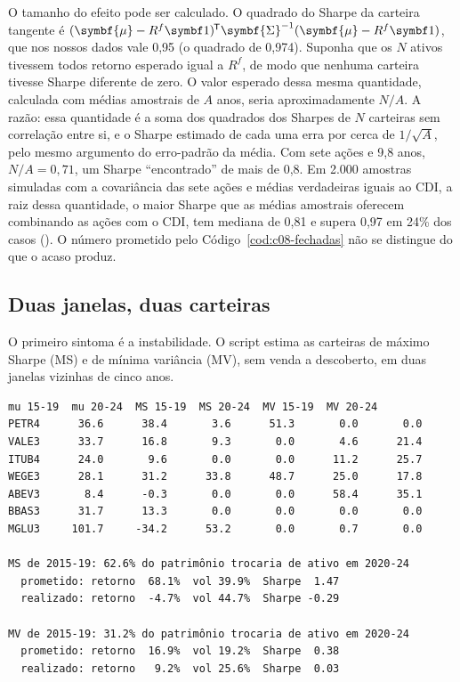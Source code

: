 O tamanho do efeito pode ser calculado. O quadrado do Sharpe da carteira tangente é $(\symbf{\mu} - R^f\vetor{1})\T\symbf{\Sigma}^{-1}(\symbf{\mu} - R^f\vetor{1})$, que nos nossos dados vale 0,95 (o quadrado de 0,974). Suponha que os $N$ ativos tivessem todos retorno esperado igual a $R^f$, de modo que nenhuma carteira tivesse Sharpe diferente de zero. O valor esperado dessa mesma quantidade, calculada com médias amostrais de $A$ anos, seria aproximadamente $N/A$. A razão: essa quantidade é a soma dos quadrados dos Sharpes de $N$ carteiras sem correlação entre si, e o Sharpe estimado de cada uma erra por cerca de $1/\sqrt{A}$, pelo mesmo argumento do erro-padrão da média. Com sete ações e 9,8 anos, $N/A = 0,71$, um Sharpe ``encontrado'' de mais de 0,8. Em 2.000 amostras simuladas com a covariância das sete ações e médias verdadeiras iguais ao CDI, a raiz dessa quantidade, o maior Sharpe que as médias amostrais oferecem combinando as ações com o CDI, tem mediana de 0,81 e supera 0,97 em 24\% dos casos (). O número prometido pelo Código~\ref{cod:c08-fechadas} não se distingue do que o acaso produz.

\subsection{Duas janelas, duas carteiras}

O primeiro sintoma é a instabilidade. O script  estima as carteiras de máximo Sharpe (MS) e de mínima variância (MV), sem venda a descoberto, em duas janelas vizinhas de cinco anos.

\begin{lstlisting}[style=saida]
       mu 15-19  mu 20-24  MS 15-19  MS 20-24  MV 15-19  MV 20-24
PETR4      36.6      38.4       3.6      51.3       0.0       0.0
VALE3      33.7      16.8       9.3       0.0       4.6      21.4
ITUB4      24.0       9.6       0.0       0.0      11.2      25.7
WEGE3      28.1      31.2      33.8      48.7      25.0      17.8
ABEV3       8.4      -0.3       0.0       0.0      58.4      35.1
BBAS3      31.7      13.3       0.0       0.0       0.0       0.0
MGLU3     101.7     -34.2      53.2       0.0       0.7       0.0

MS de 2015-19: 62.6% do patrimônio trocaria de ativo em 2020-24
  prometido: retorno  68.1%  vol 39.9%  Sharpe  1.47
  realizado: retorno  -4.7%  vol 44.7%  Sharpe -0.29

MV de 2015-19: 31.2% do patrimônio trocaria de ativo em 2020-24
  prometido: retorno  16.9%  vol 19.2%  Sharpe  0.38
  realizado: retorno   9.2%  vol 25.6%  Sharpe  0.03
\end{lstlisting}

